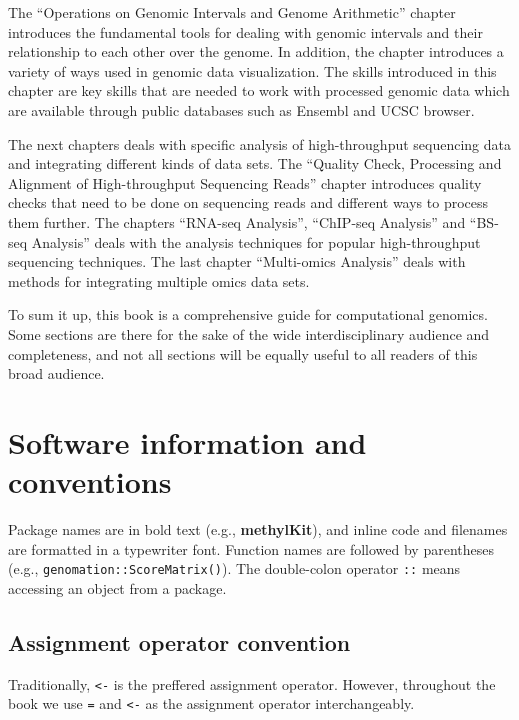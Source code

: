 \documentclass[12pt,]{krantz}
\begin{document}
The ``Operations on Genomic Intervals and Genome Arithmetic'' chapter introduces the fundamental tools for dealing with genomic intervals and their relationship to each other over the genome. In addition, the chapter introduces a variety of ways used in genomic data visualization. The skills introduced in this chapter are key skills that are needed to work with processed genomic data which are available through public databases such as Ensembl and UCSC browser.

The next chapters deals with specific analysis of high-throughput sequencing data and integrating different kinds of data sets. The ``Quality Check, Processing and Alignment of High-throughput Sequencing Reads'' chapter introduces quality checks that need to be done on sequencing reads and different ways to process them further. The chapters ``RNA-seq Analysis'', ``ChIP-seq Analysis'' and ``BS-seq Analysis'' deals
with the analysis techniques for popular high-throughput sequencing techniques. The last chapter ``Multi-omics Analysis'' deals with methods for integrating multiple omics data sets.

To sum it up, this book is a comprehensive guide for computational genomics. Some sections are there for the sake of the wide interdisciplinary audience and completeness, and not all sections will be equally useful to all readers of this broad audience.

\hypertarget{software-information-and-conventions}{%
\section*{Software information and conventions}\label{software-information-and-conventions}}


Package names are in bold text (e.g., \textbf{methylKit}), and inline code and filenames are formatted in a typewriter font. Function names are followed by parentheses (e.g., \texttt{genomation::ScoreMatrix()}). The double-colon operator \texttt{::} means accessing an object from a package.

\hypertarget{assignment-operator-convention}{%
\subsection*{Assignment operator convention}\label{assignment-operator-convention}}


Traditionally, \texttt{\textless{}-} is the preffered assignment operator. However, throughout the book we use \texttt{=} and \texttt{\textless{}-} as the assignment operator interchangeably.
\end{document}
